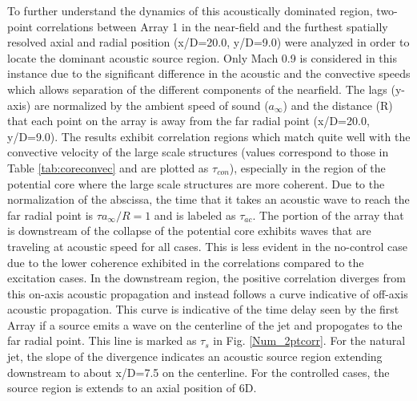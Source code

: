 \documentclass[english]{aiaa-tc}
\begin{document}
To further understand the dynamics of this acoustically dominated region, two-point correlations between Array 1 in the near-field and the furthest spatially resolved axial and radial position (x/D=20.0, y/D=9.0) were analyzed in order to locate the dominant acoustic source region. Only Mach 0.9 is considered in this instance due to the significant difference in the acoustic and the convective speeds which allows separation of the different components of the nearfield.
The lags (y-axis) are normalized by the ambient speed of sound ($a_{\infty}$) and the distance (R) that each point on the array is away from the far radial point (x/D=20.0, y/D=9.0).
The results exhibit correlation regions which match quite well with the convective velocity of the large scale structures (values correspond to those in Table \ref{tab:coreconvec} and are plotted as $\tau_{con}$), especially in the region of the potential core where the large scale structures are more coherent.
Due to the normalization of the abscissa, the time that it takes an acoustic wave to reach the far radial point is $\tau a_{\infty}/R=1$ and is labeled as $\tau_{ac}$. The portion of the array that is downstream of the collapse of the potential core exhibits waves that are traveling at acoustic speed for all cases. This is less evident in the no-control case due to the lower coherence exhibited in the correlations compared to the excitation cases.
In the downstream region, the positive correlation diverges from this on-axis acoustic propagation and instead follows a curve indicative of off-axis acoustic propagation. This curve is indicative of the time delay seen by the first Array if a source emits a wave on the centerline of the jet and propogates to the far radial point. This line is marked as $\tau_{s}$ in Fig. \ref{Num_2ptcorr}.
For the natural jet, the slope of the divergence indicates an acoustic source region extending downstream to about x/D=7.5 on the centerline. For the controlled cases, the source region is extends to an axial position of 6D.
\end{document}
